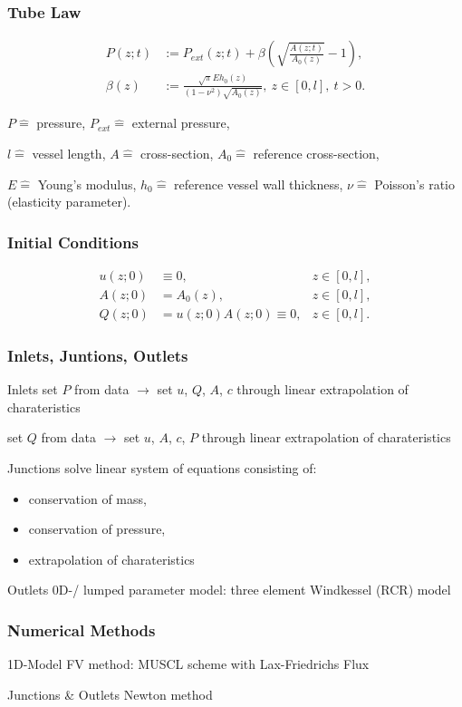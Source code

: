 \documentclass{beamer}
\begin{document}
\begin{frame}
	\frametitle{Tube Law}
	\begin{align}
		P(z;t) &:= P_{ext}(z;t) + \beta \left( \sqrt{\frac{A(z;t)}{A_0(z)}}-1 \right),      \label{eq:p_tot}\\
		\beta(z) &:=  \frac{\sqrt{\pi} E h_0(z)}{(1-\nu^2) \sqrt{A_0(z)}},\  z \in \left[ 0,l \right], \ t > 0. 
	\end{align}

	\vfill

	{\tiny \centering 
		$P \hat{=}$ pressure,
		$P_{ext} \hat{=}$ external pressure,

		$l \hat{=}$ vessel length,
		$A \hat{=}$ cross-section,
		$A_0 \hat{=}$ reference cross-section,

		$E \hat{=}$ Young's modulus,
		$h_0 \hat{=}$ reference vessel wall thickness,
		$\nu \hat{=}$ Poisson's ratio (elasticity parameter). 
	\par}

\end{frame}

\begin{frame}
	\frametitle{Initial Conditions}
	\begin{align}
		u(z;0) &\equiv 0, &z \in [0,l],\\
		A(z;0) &= A_0(z), &z \in [0,l], \\
		Q(z;0) &= u(z;0)A(z;0) \equiv 0, &z \in [0,l].
	\end{align}
	\vspace{5mm}
\end{frame}
\begin{frame}
	\frametitle{Inlets, Juntions, Outlets}
	\begin{block}{Inlets}
		set $P$ from data $\rightarrow$ set $u$, $Q$, $A$, $c$ through linear extrapolation of charateristics

		set $Q$ from data $\rightarrow$ set $u$, $A$, $c$, $P$ through linear extrapolation of charateristics
	\end{block}
	\begin{block}{Junctions}
		solve linear system of equations consisting of:
		\begin{itemize}
			\item conservation of mass, 
			\item conservation of pressure, 
			\item extrapolation of charateristics	
		\end{itemize}
	\end{block}
	\begin{block}{Outlets}
		0D-/ lumped parameter model: three element Windkessel (RCR) model 
	\end{block}
\end{frame}
\begin{frame}
	\frametitle{Numerical Methods}
	\begin{block}{1D-Model}
		FV method: MUSCL scheme with Lax-Friedrichs Flux
	\end{block}
	\begin{block}{Junctions \& Outlets}
		Newton method
	\end{block}


\end{frame}
\end{document}

